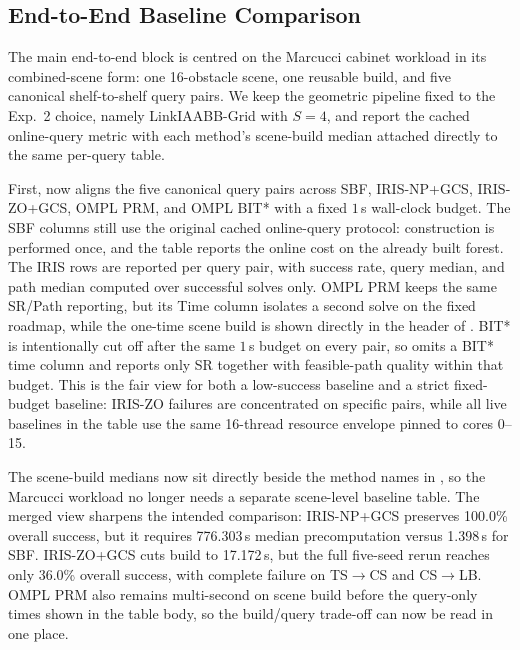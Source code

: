 \documentclass[journal]{IEEEtran}
\begin{document}


\subsection{End-to-End Baseline Comparison}\label{sec:exp_e2e}

The main end-to-end block is centred on the Marcucci cabinet workload in its
combined-scene form: one 16-obstacle scene, one reusable build, and five
canonical shelf-to-shelf query pairs. We keep the geometric pipeline fixed to
the Exp.~2 choice, namely LinkIAABB-Grid with $S=4$, and report the cached
online-query metric with each method's scene-build median attached directly to
the same per-query table.

First,  now aligns the five canonical query pairs across SBF,
IRIS-NP+GCS, IRIS-ZO+GCS, OMPL PRM, and OMPL BIT* with a fixed $1$\,s
wall-clock budget. The SBF columns still use the original cached online-query
protocol: construction is performed once, and the table reports the online
cost on the already built forest. The IRIS rows are reported per query pair,
with success rate, query median, and path median computed over successful
solves only. OMPL PRM keeps the same SR/Path reporting, but its Time column
isolates a second solve on the fixed roadmap, while the one-time scene build
is shown directly in the header of . BIT* is intentionally cut off after the same
$1$\,s budget on every pair, so  omits a BIT* time column and
reports only SR together with feasible-path quality within that budget. This
is the fair view for both a low-success baseline and a strict fixed-budget
baseline: IRIS-ZO failures are concentrated on specific pairs, while all live
baselines in the table use the same 16-thread resource envelope pinned to
cores 0--15.



The scene-build medians now sit directly beside the method names in
, so the Marcucci workload no longer needs a separate
scene-level baseline table. The merged view sharpens the intended comparison:
IRIS-NP+GCS preserves 100.0\% overall success, but it requires 776.303\,s
median precomputation versus 1.398\,s for SBF. IRIS-ZO+GCS cuts build to
17.172\,s, but the full five-seed rerun reaches only 36.0\% overall success,
with complete failure on TS$\rightarrow$CS and CS$\rightarrow$LB. OMPL PRM also
remains multi-second on scene build before the query-only times shown in the
table body, so the build/query trade-off can now be read in one place.
\end{document}
